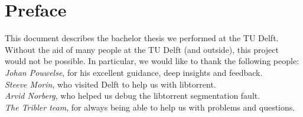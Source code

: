 \chapter*{Preface}
This document describes the bachelor thesis we performed at the TU Delft. Without the aid of many people at the TU Delft (and outside), this project would not be possible. In particular, we would like to thank the following people: \\

\emph{Johan Pouwelse}, for his excellent guidance, deep insights and feedback.\\

\emph{Steeve Morin}, who visited Delft to help us with libtorrent.\\

\emph{Arvid Norberg}, who helped us debug the libtorrent segmentation fault.\\

\emph{The Tribler team}, for always being able to help us with problems and questions.